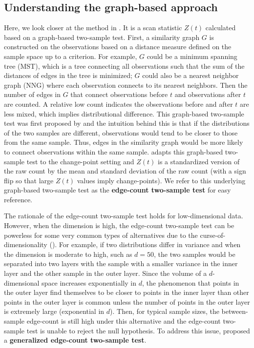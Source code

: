 \documentclass[arxiv, preprint]{imsart}
\numberwithin{equation}{section}
\theoremstyle{plain}
\begin{document}
\subsection{Understanding the graph-based approach}
\label{sec:2.2}
Here, we look closer at the method in \cite{chen2015graph}. It is a scan statistic $Z(t)$ calculated based on a graph-based two-sample test. First, a similarity graph $G$ is constructed on the observations based on a distance measure defined on the sample space up to a criterion. For example, $G$ could be a minimum spanning tree (MST), which is a tree connecting all observations such that the sum of the distances of edges in the tree is minimized; $G$ could also be a nearest neighbor graph (NNG) where each observation connects to its nearest neighbors. Then the number of edges in $G$ that connect observations before $t$ and observations after $t$ are counted. A relative low count indicates the observations before and after $t$ are less mixed, which implies distributional difference. This graph-based two-sample test was first proposed by \cite{friedman1979multivariate} and the intuition behind this is that if the distributions of the two samples are different, observations would tend to be closer to those from the same sample. Thus, edges in the similarity graph would be more likely to connect observations within the same sample. \cite{chen2015graph} adapts this graph-based two-sample test to the change-point setting and $Z(t)$ is a standardized version of the raw count by the mean and standard deviation of the raw count (with a sign flip so that large $Z(t)$ values imply change-points). We refer to this underlying graph-based two-sample test as the \textbf{edge-count two-sample test} for easy reference. 

The rationale of the edge-count two-sample test holds for low-dimensional data. However, when the dimension is high, the edge-count two-sample test can be powerless for some very common types of alternatives due to the curse-of-dimensionality (\cite{chen2017new}). For example, if two distributions differ in variance and when the dimension is moderate to high, such as $d=50$, the two samples would be separated into two layers with the sample with a smaller variance in the inner layer and the other sample in the outer layer. Since the volume of a $d$-dimensional space increases exponentially in $d$, the phenomenon that points in the outer layer find themselves to be closer to points in the inner layer than other points in the outer layer is common unless the number of points in the outer layer is extremely large (exponential in $d$). Then, for typical sample sizes, the between-sample edge-count is still high under this alternative and the edge-count two-sample test is unable to reject the null hypothesis.  To address this issue, \cite{chen2017new} proposed a \textbf{generalized edge-count two-sample test}.
\end{document}
